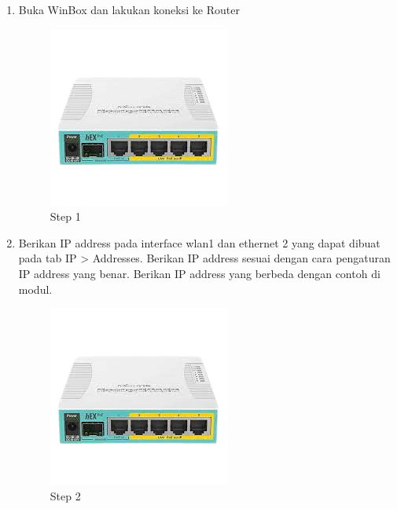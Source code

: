 \begin{enumerate}
	\item Buka WinBox dan lakukan koneksi ke Router
	\begin{figure}[H]
		\centering
		\includegraphics[width=0.5\linewidth]{P1/img/contoh.png}
		\caption{Step 1}
		\label{fig:gambar22}
	\end{figure}

	\item Berikan IP address pada interface wlan1 dan ethernet 2 yang dapat dibuat pada tab IP > Addresses. Berikan IP address sesuai dengan cara pengaturan IP address yang benar. Berikan IP
	address yang berbeda dengan contoh di modul.
	\begin{figure}[H]
		\centering
		\includegraphics[width=0.5\linewidth]{P1/img/contoh.png}
		\caption{Step 2}
		\label{fig:gambar23}
	\end{figure}


\end{enumerate}

